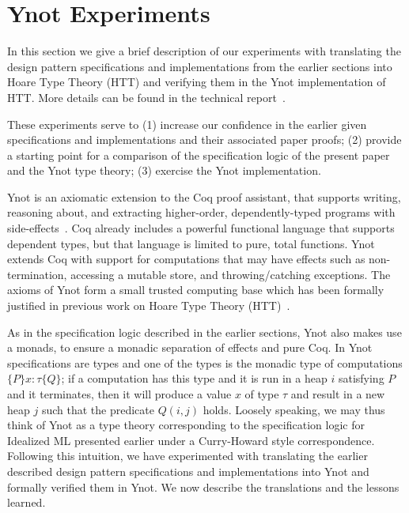 
%
%


\section{Ynot Experiments}
\label{sec:ynot-experiments}

In this section we give a brief description of our experiments with
translating the design pattern specifications and implementations from
the earlier sections into Hoare Type Theory (HTT) and verifying them in the
Ynot implementation of HTT. More details can be found in the 
technical report~\cite{svendsen08}.

These experiments serve to (1) increase our confidence in the earlier given
specifications and implementations and their associated paper proofs; (2)
provide a starting point for a comparison of the specification logic of the
present paper and the Ynot type theory; (3) exercise the Ynot
implementation.

Ynot is an axiomatic extension to the Coq proof assistant, that supports
writing, reasoning about, and extracting higher-order, dependently-typed
programs with side-effects~\cite{nanevski08}.  Coq already includes a
powerful functional language that supports dependent types, but that
language is limited to pure, total functions.  Ynot extends Coq with
support for computations that may have effects such as non-termination,
accessing a mutable store, and throwing/catching exceptions.  The axioms of
Ynot form a small trusted computing base which has been formally justified
in previous work on Hoare Type Theory (HTT)~\cite{nanevski06separation,
  nanevski07esop, petersen08}.

As in the specification logic described in the earlier sections, Ynot
also makes use a monads, to ensure a monadic separation of effects and
pure Coq.  In Ynot specifications are types and one of the types is
the monadic type of computations $\{ P \} x:\tau \{ Q \}$; if a
computation has this type and it is run in a heap $i$ satisfying $P$
and it terminates, then it will produce a value $x$ of type $\tau$ and
result in a new heap $j$ such that the predicate $Q(i,j)$
holds. Loosely speaking, we may thus think of Ynot as a type theory
corresponding to the specification logic for Idealized ML presented
earlier under a Curry-Howard style correspondence.  Following this
intuition, we have experimented with translating the earlier described
design pattern specifications and implementations into Ynot and
formally verified them in Ynot.  We now describe the translations and
the lessons learned.

